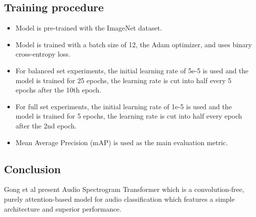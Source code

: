 \subsection{Training procedure}
\begin{itemize}
\item Model is pre-trained with the ImageNet dataset. 
\item Model is trained  with a batch size of 12, the Adam optimizer, and uses binary cross-entropy loss.
\item For balanced set experiments, the initial learning rate of 5e-5  is used and the model is trained for  25 epochs, the learning rate is cut into half every 5 epochs after the 10th epoch. 
\item For full set experiments, the  initial learning rate of 1e-5 is used and the model is trained for 5 epochs, the learning rate is cut into half every epoch after the 2nd epoch.
\item Mean Average Precision (mAP) is used as the main evaluation metric.
\end{itemize}

\subsection{Conclusion}
\par Gong et al present Audio Spectrogram Transformer which is a convolution-free, purely attention-based model for audio classification which features a simple architecture and superior performance.
